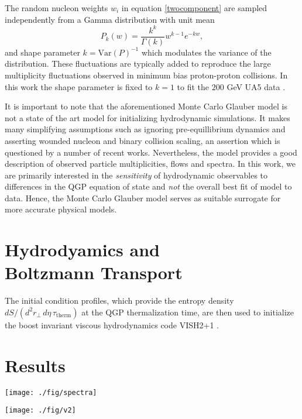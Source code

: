 \documentclass[aps,prc,reprint,amsmath,nofootinbib,superscriptaddress]{revtex4-1}
\begin{document}
The random nucleon weights $w_i$ in equation \eqref{twocomponent} are sampled independently from a Gamma distribution with unit mean
\begin{equation}
 P_k(w) = \frac{k^k}{\Gamma(k)} w^{k-1} e^{-k w},
\end{equation}
and shape parameter $k = \text{Var}(P)^{-1}$ which modulates the variance of the distribution. These fluctuations are typically added \cite{?} to reproduce the large multiplicity fluctuations observed in minimum bias proton-proton 
collisions. In this work the shape parameter is fixed to $k=1$ to fit the $200$ GeV UA5 data \cite{?}. 

It is important to note that the aforementioned Monte Carlo Glauber model is not a state of the art model for initializing hydrodynamic simulations. It makes many simplifying assumptions such as ignoring pre-equillibrium dynamics
and asserting wounded nucleon and binary collision scaling, an assertion which is questioned by a number of recent works. Nevertheless, the model provides a good description of observed particle multiplicities, flows and spectra. In this work, we 
are primarily interested in the \emph{sensitivity} of hydrodynamic observables to differences in the QGP equation of state and \emph{not} the overall best fit of model to data. Hence, the Monte Carlo Glauber model serves as suitable 
surrogate for more accurate physical models.

\section{Hydrodyamics and \\ Boltzmann Transport}

The initial condition profiles, which provide the entropy density $dS/(d^2r_\perp\, d\eta\, \tau_\text{therm})$ at the QGP thermalization time, are then used to initialize the boost invariant viscous hydrodynamics code 
{\ttfamily VISH2+1} \cite{?}. 



\section{Results}

\begin{figure*}[t]
  \texttt{[image: ./fig/spectra]}
  \caption{
    \label{fig:spectra}
  }
\end{figure*}

\begin{figure*}[t]
  \texttt{[image: ./fig/v2]}
  \caption{
    \label{fig:spectra}
  }
\end{figure*}
\end{document}
